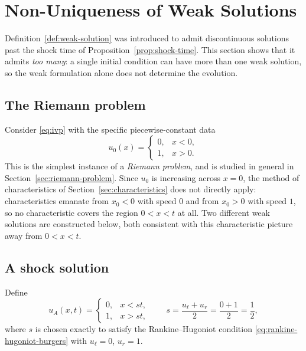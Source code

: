 \section{Non-Uniqueness of Weak Solutions}
\label{sec:nonuniqueness}

Definition~\ref{def:weak-solution} was introduced to admit discontinuous
solutions past the shock time of Proposition~\ref{prop:shock-time}. This
section shows that it admits \emph{too many}: a single initial condition
can have more than one weak solution, so the weak formulation alone does
not determine the evolution.

\subsection{The Riemann problem}
\label{subsec:nonuniq-setup}

Consider \eqref{eq:ivp} with the specific piecewise-constant data
\begin{equation}
  \label{eq:riemann-data}
  u_0(x) = \begin{cases} 0, & x < 0, \\ 1, & x > 0. \end{cases}
\end{equation}
This is the simplest instance of a \emph{Riemann problem}, and is studied
in general in Section~\ref{sec:riemann-problem}. Since $u_0$ is
increasing across $x=0$, the method of characteristics of
Section~\ref{sec:characteristics} does not directly apply: characteristics
emanate from $x_0<0$ with speed $0$ and from $x_0>0$ with speed $1$, so no
characteristic covers the region $0<x<t$ at all. Two different weak
solutions are constructed below, both consistent with this characteristic
picture away from $0<x<t$.

\subsection{A shock solution}
\label{subsec:nonuniq-shock}

Define
\begin{equation}
  \label{eq:shock-solution}
  u_A(x,t) = \begin{cases} 0, & x < st, \\ 1, & x > st, \end{cases}
  \qquad s = \frac{u_\ell+u_r}{2} = \frac{0+1}{2} = \frac12,
\end{equation}
where $s$ is chosen exactly to satisfy the Rankine--Hugoniot condition
\eqref{eq:rankine-hugoniot-burgers} with $u_\ell=0$, $u_r=1$.

